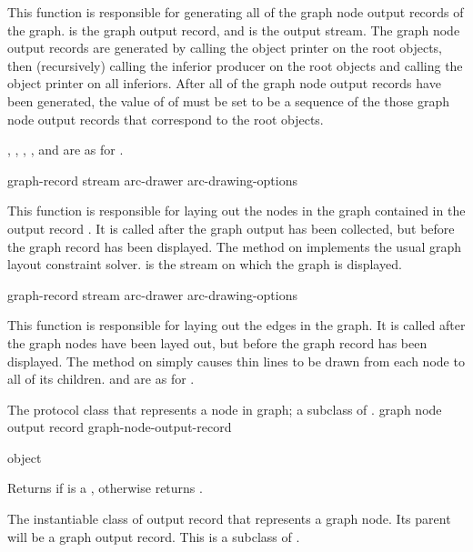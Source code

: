 This function is responsible for generating all of the graph node output records
of the graph.   is the graph output record, and 
is the output stream.  The graph node output records are generated by calling
the object printer on the root objects, then (recursively) calling the inferior
producer on the root objects and calling the object printer on all inferiors.
After all of the graph node output records have been generated, the value of
 of  must be set to be a sequence of the
those graph node output records that correspond to the root objects.

, , ,
, and  are as for
.

 {graph-record stream arc-drawer arc-drawing-options} 

This function is responsible for laying out the nodes in the graph contained in
the output record .  It is called after the graph output has
been collected, but before the graph record has been displayed.  The method on
 implements the usual graph layout constraint
solver.   is the stream on which the graph is displayed.

 {graph-record stream arc-drawer arc-drawing-options}

This function is responsible for laying out the edges in the graph.  It is
called after the graph nodes have been layed out, but before the graph record
has been displayed.  The method on  simply
causes thin lines to be drawn from each node to all of its children.
 and  are as for .



The protocol class that represents a node in graph; a subclass of
.
 {graph node output record} {graph-node-output-record}

 {object}

Returns  if  is a ,
otherwise returns .


The instantiable class of output record that represents a graph node.  Its
parent will be a graph output record.  This is a subclass of
.

